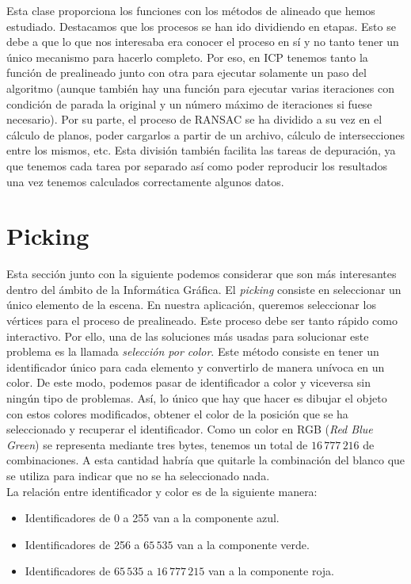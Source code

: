 Esta clase proporciona los funciones con los métodos de alineado que hemos estudiado. Destacamos que los procesos se han ido dividiendo en etapas. Esto se debe a que lo que nos interesaba era conocer el proceso en sí y no tanto tener un único mecanismo para hacerlo completo. Por eso, en ICP tenemos tanto la función de prealineado junto con otra para ejecutar solamente un paso del algoritmo (aunque también hay una función para ejecutar varias iteraciones con condición de parada la original y un número máximo de iteraciones si fuese necesario). Por su parte, el proceso de RANSAC se ha dividido a su vez en el cálculo de planos, poder cargarlos a partir de un archivo, cálculo de intersecciones entre los mismos, etc. Esta división también facilita las tareas de depuración, ya que tenemos cada tarea por separado así como poder reproducir los resultados una vez tenemos calculados correctamente algunos datos.

\section{Picking}\label{sec:picking}
Esta sección junto con la siguiente podemos considerar que son más interesantes dentro del ámbito de la Informática Gráfica. El \textit{picking} consiste en seleccionar un único elemento de la escena. En nuestra aplicación, queremos seleccionar los vértices para el proceso de prealineado. Este proceso debe ser tanto rápido como interactivo. Por ello, una de las soluciones más usadas para solucionar este problema es la llamada \textit{selección por color}. Este método consiste en tener un identificador único para cada elemento y convertirlo de manera unívoca en un color. De este modo, podemos pasar de identificador a color y viceversa sin ningún tipo de problemas. Así, lo único que hay que hacer es dibujar el objeto con estos colores modificados, obtener el color de la posición que se ha seleccionado y recuperar el identificador. Como un color en RGB (\textit{Red Blue Green}) se representa mediante tres bytes, tenemos un total de $ 16\,777\,216 $ de combinaciones. A esta cantidad habría que quitarle la combinación del blanco que se utiliza para indicar que no se ha seleccionado nada. \\

La relación entre identificador y color es de la siguiente manera:
\begin{itemize}
	\item Identificadores de 0 a 255 van a la componente azul.
	\item Identificadores de 256 a $ 65\,535 $ van a la componente verde.
	\item Identificadores de $ 65\,535 $ a $ 16\,777\,215 $ van a la componente roja.
\end{itemize}

